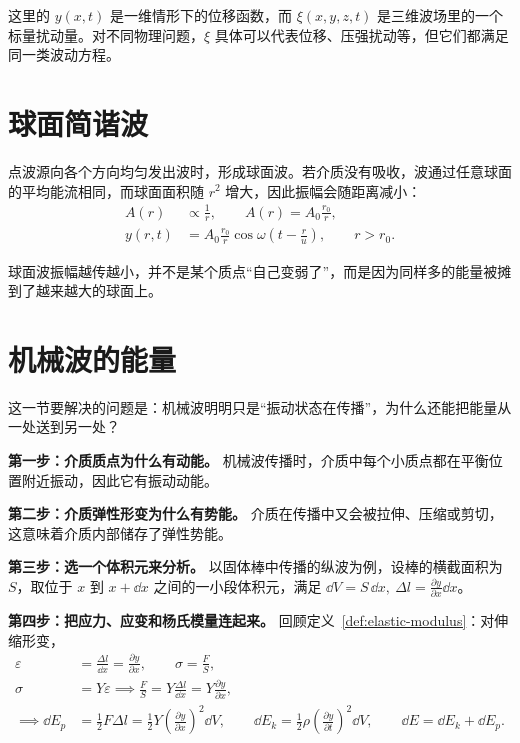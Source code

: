 \documentclass[lang=cn,11pt]{elegantbook}
\newcommand{\bridge}[1]{\begin{note}#1\end{note}}
\begin{document}
\begin{note}
这里的 \(y(x,t)\) 是一维情形下的位移函数，而 \(\xi(x,y,z,t)\) 是三维波场里的一个标量扰动量。对不同物理问题，\(\xi\) 具体可以代表位移、压强扰动等，但它们都满足同一类波动方程。
\end{note}

\section{球面简谐波}

点波源向各个方向均匀发出波时，形成球面波。若介质没有吸收，波通过任意球面的平均能流相同，而球面面积随 \(r^2\) 增大，因此振幅会随距离减小：
\[
\begin{aligned}
A(r)&\propto \frac{1}{r},\qquad
A(r)=A_0\frac{r_0}{r},\\
y(r,t)&=A_0\frac{r_0}{r}\cos\omega\left(t-\frac{r}{u}\right),\qquad r>r_0.
\end{aligned}
\]

\bridge{球面波振幅越传越小，并不是某个质点“自己变弱了”，而是因为同样多的能量被摊到了越来越大的球面上。}

\section{机械波的能量}

这一节要解决的问题是：机械波明明只是“振动状态在传播”，为什么还能把能量从一处送到另一处？

\textbf{第一步：介质质点为什么有动能。} 机械波传播时，介质中每个小质点都在平衡位置附近振动，因此它有振动动能。

\textbf{第二步：介质弹性形变为什么有势能。} 介质在传播中又会被拉伸、压缩或剪切，这意味着介质内部储存了弹性势能。

\textbf{第三步：选一个体积元来分析。} 以固体棒中传播的纵波为例，设棒的横截面积为 \(S\)，取位于 \(x\) 到 \(x+\dd x\) 之间的一小段体积元，满足 \(\dd V=S\,\dd x,\ \Delta l=\frac{\partial y}{\partial x}\dd x\)。

\textbf{第四步：把应力、应变和杨氏模量连起来。} 回顾定义~\ref{def:elastic-modulus}：对伸缩形变，
\[
\begin{aligned}
\varepsilon&=\frac{\Delta l}{\dd x}=\frac{\partial y}{\partial x},\qquad
\sigma=\frac{F}{S},\\
\sigma&=Y\varepsilon
\implies
\frac{F}{S}=Y\frac{\Delta l}{\dd x}=Y\frac{\partial y}{\partial x},\\
\implies \dd E_p&=\frac12 F\Delta l
=\frac12 Y\left(\frac{\partial y}{\partial x}\right)^2\dd V,\qquad
\dd E_k=\frac12 \rho\left(\frac{\partial y}{\partial t}\right)^2\dd V,\qquad
\dd E=\dd E_k+\dd E_p.
\end{aligned}
\]
\end{document}
